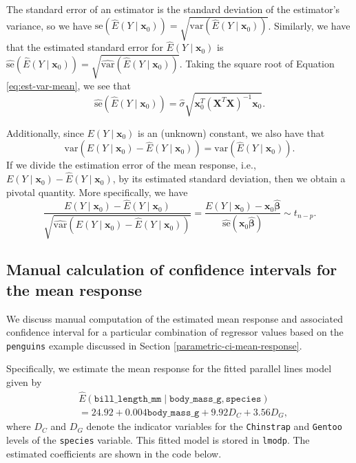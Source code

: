 \documentclass[
]{book}
\theoremstyle{definition}
\theoremstyle{definition}
\theoremstyle{definition}
\theoremstyle{definition}
\theoremstyle{remark}
\begin{document}
The standard error of an estimator is the standard deviation of the
estimator's variance, so we have
\(\mathrm{se}\left(\hat{E}(Y\mid\mathbf{x}_0)\right)=\sqrt{\mathrm{var}\left(\hat{E}(Y\mid \mathbf{x}_0)\right)}\).
Similarly, we have that the estimated standard error for
\(\hat{E}(Y\mid \mathbf{x}_0)\) is
\(\hat{\mathrm{se}}\left(\hat{E}(Y\mid\mathbf{x}_0)\right)=\sqrt{\hat{\mathrm{var}}\left(\hat{E}(Y\mid \mathbf{x}_0)\right)}\).
Taking the square root of Equation \eqref{eq:est-var-mean}, we see that
\[
\hat{\mathrm{se}}\left(\hat{E}(Y\mid \mathbf{x}_0)\right)=\hat{\sigma} \sqrt{\mathbf{x}_0^T (\mathbf{X}^T \mathbf{X})^{-1}\mathbf{x}_0}.
\]

Additionally, since \(E(Y\mid \mathbf{x}_0)\) is an (unknown) constant, we
also have that
\[\mathrm{var}\left(E(Y\mid \mathbf{x}_0)-\hat{E}(Y\mid \mathbf{x}_0)\right)=\mathrm{var}\left(\hat{E}(Y\mid \mathbf{x}_0)\right).
\]
If we divide the estimation error of the mean response, i.e.,
\(E(Y\mid \mathbf{x}_0)-\hat{E}(Y\mid \mathbf{x}_0)\), by its estimated
standard deviation, then we obtain a pivotal quantity. More
specifically, we have
\[
\frac{E(Y\mid \mathbf{x}_0)-\hat{E}(Y\mid \mathbf{x}_0)}{\sqrt{\hat{\mathrm{var}}\left(E(Y\mid \mathbf{x}_0)-\hat{E}(Y\mid \mathbf{x}_0)\right)}} = \frac{E(Y\mid \mathbf{x}_0)- \mathbf{x}_0 \hat{\boldsymbol{\beta}}}{ \hat{\mathrm{se}}(\mathbf{x}_0\hat{\boldsymbol{\beta}})}\sim t_{n-p}.
\]

\hypertarget{manual-calc-ci-mean-response}{%
\subsection{Manual calculation of confidence intervals for the mean response}\label{manual-calc-ci-mean-response}}

We discuss manual computation of the estimated mean response and associated confidence interval for a particular
combination of regressor values based on the \texttt{penguins} example discussed in Section \ref{parametric-ci-mean-response}.

Specifically, we estimate the mean response for the fitted parallel
lines model given by\[
\begin{aligned}
&\hat{E}(\mathtt{bill\_length\_mm} \mid \mathtt{body\_mass\_g}, \mathtt{species})\\
&= 24.92 + 0.004 \mathtt{body\_mass\_g} + 9.92 D_C + 3.56 D_G,
\end{aligned}
\]
where \(D_C\) and \(D_G\) denote the indicator variables for the \texttt{Chinstrap} and \texttt{Gentoo} levels of the \texttt{species} variable. This fitted model is stored in \texttt{lmodp}. The estimated coefficients are shown in the code below.
\end{document}
